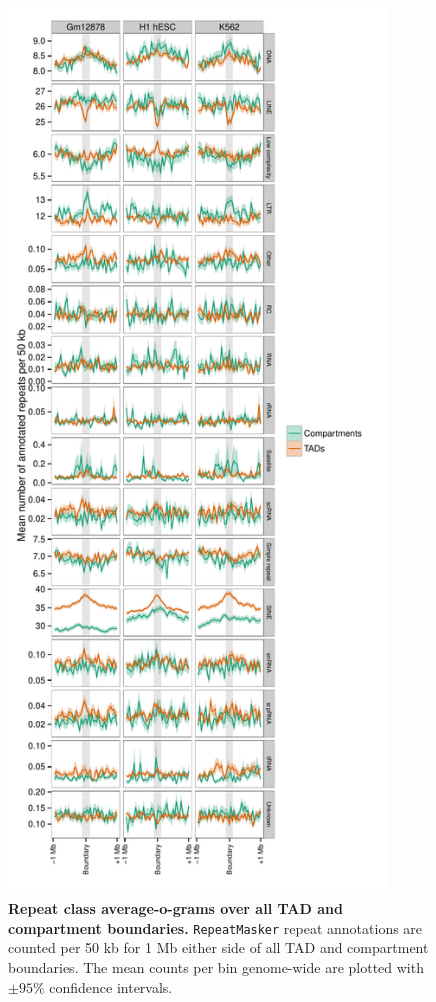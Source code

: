 \documentclass[a4paper,11pt,oneside]{book}
\begin{document}
\begin{figure}
\begin{center} 
\includegraphics[width=3.95in]{figs/rep_classprofiles.pdf}
\captionsetup{width=\textwidth}
\caption[Repeat class average-o-grams over all TAD and compartment boundaries.]{ {\bf Repeat class average-o-grams over all TAD and compartment boundaries.}
\texttt{RepeatMasker} repeat annotations are counted per 50 kb for 1 Mb either side of all TAD and compartment boundaries. The mean counts per bin genome-wide are plotted with $\pm 95\%$ confidence intervals.
}\label{fig:rep_classprofiles}
\end{center}
\end{figure} 
\end{document}
